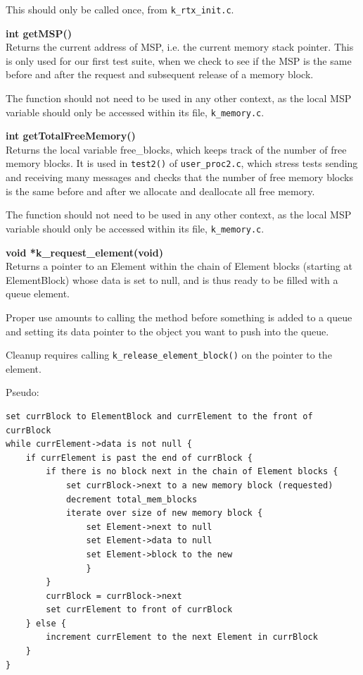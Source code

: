 \documentclass[11pt, oneside]{article}
\begin{document}
This should only be called once, from {\tt k\_rtx\_init.c}.


{\bf int getMSP()}\\
Returns the current address of MSP, i.e. the current memory stack pointer. This is only used for our first test suite, when we check to see if the MSP is the same before and after the request and subsequent release of a memory block.

The function should not need to be used in any other context, as the local MSP variable should only be accessed within its file, {\tt k\_memory.c}.

{\bf int getTotalFreeMemory()}\\
Returns the local variable free\_blocks, which keeps track of the number of free memory blocks. It is used in {\tt test2()} of {\tt user\_proc2.c}, which stress tests sending and receiving many messages and checks that the number of free memory blocks is the same before and after we allocate and deallocate all free memory.

The function should not need to be used in any other context, as the local MSP variable should only be accessed within its file, {\tt k\_memory.c}.

{\bf void *k\_request\_element(void)}\\
Returns a pointer to an Element within the chain of Element blocks (starting at ElementBlock) whose data is set to null, and is thus ready to be filled with a queue element.

Proper use amounts to calling the method before something is added to a queue and setting its data pointer to the object you want to push into the queue.

Cleanup requires calling {\tt k\_release\_element\_block()} on the pointer to the element.

Pseudo:
\begin{verbatim}
set currBlock to ElementBlock and currElement to the front of currBlock
while currElement->data is not null {
    if currElement is past the end of currBlock {
        if there is no block next in the chain of Element blocks {
            set currBlock->next to a new memory block (requested)
            decrement total_mem_blocks
            iterate over size of new memory block {
                set Element->next to null
                set Element->data to null
                set Element->block to the new
                }
        }
        currBlock = currBlock->next
        set currElement to front of currBlock
    } else {
        increment currElement to the next Element in currBlock
    }
}
\end{verbatim}
\end{document}
